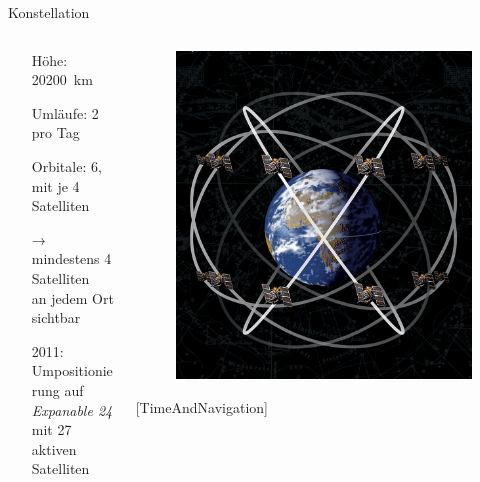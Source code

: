\begin{frame}{Konstellation}
    \begin{columns}
        \begin{column}{0.5\textwidth}
            \begin{itemize}
                \item[Höhe:] \SI{20200}{\kilo\meter}
                \item[Umläufe:] 2 pro Tag
                \item[Orbitale:] 6, mit je 4 Satelliten
                \item[→] mindestens 4 Satelliten\\an jedem Ort sichtbar
                \item[2011:] Umpositionierung auf \textit{Expanable 24}\\mit 27 aktiven Satelliten
            \end{itemize}
        \end{column}
        \begin{column}{0.3\textwidth}
            \begin{figure}
                \centering
                \includegraphics[width=\textwidth]{images/satelliten_schaubild.jpg}
            \end{figure}
            {\small [TimeAndNavigation]}
        \end{column}
    \end{columns}
\end{frame}

